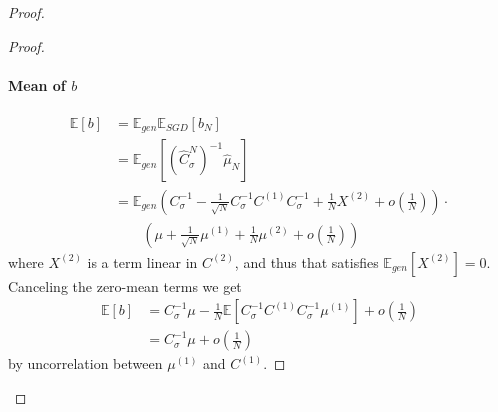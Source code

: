 \documentclass[11pt]{article}
\newcommand{\EE}{\mathbb{E}}
\begin{document}
\begin{proof}
\begin{proof}
\paragraph{Mean of $b$}
\begin{align}
    \EE[b] &=  \EE_{gen}\EE_{SGD}[b_N] \\
    &= \EE_{gen}[(\hat C_\sigma^N)^{-1} \hat \mu_N] \\
    &= \EE_{gen} \left(C_\sigma^{-1} - \frac{1}{\sqrt{N}} C_\sigma^{-1}   C^{(1)} C_\sigma^{-1} +  \frac1N X^{(2)} + o\left( \frac{1}{N}\right) \right) \cdot  \label{eq:exp_bN2} \\ &\qquad  \left(\mu + \frac{1}{\sqrt{N}} \mu^{(1)} + \frac{1}{N}\mu^{(2)} + o\left(\frac{1}{N}\right)\right) \nonumber
\end{align}
where $X^{(2)}$ is a term linear in $C^{(2)}$, and thus that satisfies $\EE_{gen}[X^{(2)}] = 0$. Canceling the zero-mean terms we get 
\begin{align*}
\EE[b] &=  C_\sigma^{-1}\mu - \frac{1}{N} \EE[C_\sigma^{-1} C^{(1)} C_\sigma^{-1} \mu^{(1)}] + o\left(\frac{1}{N}\right) \\
&= C_\sigma^{-1}\mu + o\left(\frac{1}{N}\right)
\end{align*}
by uncorrelation between $\mu^{(1)}$ and $C^{(1)}$. 


\end{proof}
\end{proof}
\end{document}
